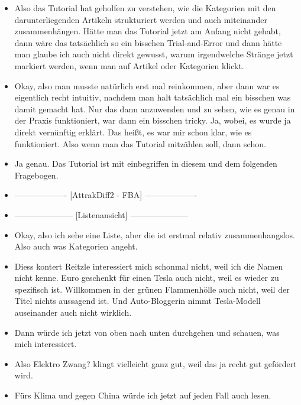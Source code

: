 {\begin{itemize}[]
        \item {} Also das Tutorial hat geholfen zu verstehen, wie die Kategorien mit den darunterliegenden Artikeln strukturiert werden und auch miteinander zusammenhängen.
        Hätte man das Tutorial jetzt am Anfang nicht gehabt, dann wäre das tatsächlich so ein bisschen Trial-and-Error und dann hätte man glaube ich auch nicht direkt gewusst, warum irgendwelche Stränge jetzt markiert werden, wenn man auf Artikel oder Kategorien klickt.
        \item {} Okay, also man musste natürlich erst mal reinkommen, aber dann war es eigentlich recht intuitiv, nachdem man halt tatsächlich mal ein bisschen was damit gemacht hat.
              Nur das dann anzuwenden und zu sehen, wie es genau in der Praxis funktioniert, war dann ein bisschen tricky.
              Ja, wobei, es wurde ja direkt vernünftig erklärt.
              Das heißt, es war mir schon klar, wie es funktioniert.
              Also wenn man das Tutorial mitzählen soll, dann schon.
        \item {} Ja genau. Das Tutorial ist mit einbegriffen in diesem und dem folgenden Fragebogen.
        \item {-------------------} [AttrakDiff2 - FBA] {-------------------}
        \item {---------------------} [Listenansicht] {---------------------}
        \item {} Okay, also ich sehe eine Liste, aber die ist erstmal relativ zusammenhangslos.
              Also auch was Kategorien angeht.
        \item {} \flqq Diess kontert Reitzle\frqq{} interessiert mich schonmal nicht, weil ich die Namen nicht kenne.
               Euro geschenkt für einen Tesla\frqq{} auch nicht, weil es wieder zu spezifisch ist.
              \flqq Willkommen in der grünen Flammenhölle\frqq{} auch nicht, weil der Titel nichts aussagend ist.
              Und \flqq Auto-Bloggerin nimmt Tesla-Modell auseinander\frqq{} auch nicht wirklich.
        \item {} Dann würde ich jetzt von oben nach unten durchgehen und schauen, was mich interessiert.
        \item {} Also \flqq Elektro Zwang?\frqq{} klingt vielleicht ganz gut, weil das ja recht gut gefördert wird.
        \item {} \flqq Fürs Klima und gegen China\frqq{} würde ich jetzt auf jeden Fall auch lesen.

\end{itemize}}

